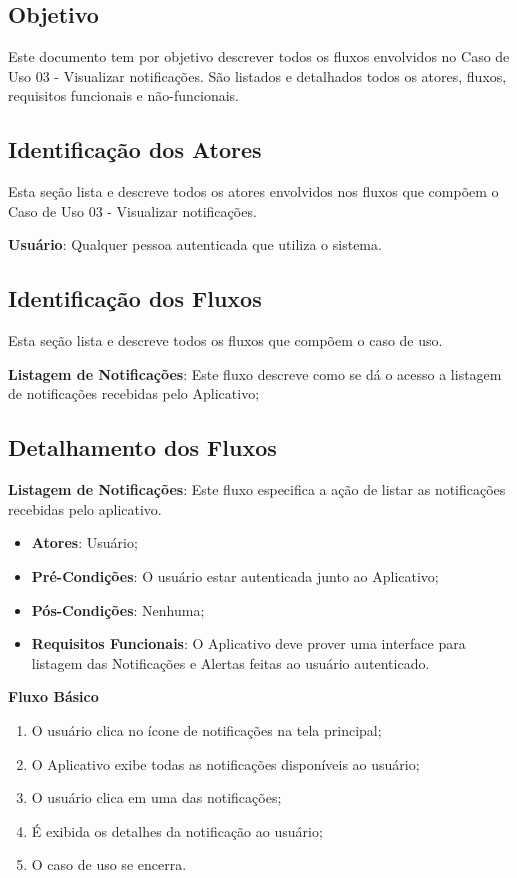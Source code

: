 \subsection*{Objetivo}
Este documento tem por objetivo descrever todos os fluxos envolvidos no Caso de Uso 03 - Visualizar notificações. São listados e detalhados todos os atores, fluxos, requisitos funcionais e não-funcionais.

\subsection*{Identificação dos Atores}
Esta seção lista e descreve todos os atores envolvidos nos fluxos que compõem o Caso de Uso 03 - Visualizar notificações.
\begin{lista}
  \item \textbf{Usuário}: Qualquer pessoa autenticada que utiliza o sistema.
\end{lista}

\subsection*{Identificação dos Fluxos}
Esta seção lista e descreve todos os fluxos que compõem o caso de uso.
\begin{lista}
  \item \textbf{Listagem de Notificações}: Este fluxo descreve como se dá o acesso a listagem de notificações recebidas pelo Aplicativo;
\end{lista}

\subsection*{Detalhamento dos Fluxos}
\begin{lista}
  \item \textbf{Listagem de Notificações}: Este fluxo especifica a ação de listar as notificações recebidas pelo aplicativo.
    \begin{itemize}
    \item \textbf{Atores}: Usuário;
    \item \textbf{Pré-Condições}: O usuário estar autenticada junto ao Aplicativo;
    \item \textbf{Pós-Condições}: Nenhuma;
    \item \textbf{Requisitos Funcionais}: O Aplicativo deve prover uma interface para listagem das Notificações e Alertas feitas ao usuário autenticado.
    \end{itemize}
	
    \textbf{Fluxo Básico}
    \begin{enumerate}
    \item O usuário clica no ícone de notificações na tela principal;
    \item O Aplicativo exibe todas as notificações disponíveis ao usuário;
    \item O usuário clica em uma das notificações;
    \item É exibida os detalhes da notificação ao usuário;
    \item O caso de uso se encerra.
    \end{enumerate}
\end{lista}

